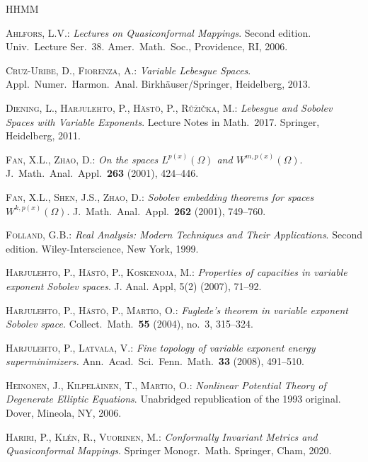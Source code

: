 \documentclass[12pt]{amsart}
\numberwithin{equation}{section}
\theoremstyle{plain}
\theoremstyle{definition}
\begin{document}
\begin{thebibliography}{HHMM}

{\small \textsc{Ahlfors, L.V.:}
\textit{Lectures on Quasiconformal Mappings}.
Second edition.
Univ.\ Lecture Ser.\ 38.
Amer.\ Math.\ Soc., Providence, RI, 2006.}


{\small \textsc{Cruz-Uribe, D., Fiorenza, A.:}
\textit{Variable Lebesgue Spaces}.
Appl.\ Numer.\ Harmon.\ Anal.
Birkh\"auser/Springer, Heidelberg, 2013.}

{\small \textsc{Diening, L., Harjulehto, P., H\"ast\"o, P.,
R\r{u}\v{z}i\v{c}ka, M.:}
\textit{Lebesgue and Sobolev Spaces with Variable Exponents}.
Lecture Notes in Math.\ 2017.
Springer, Heidelberg, 2011.}


{\small \textsc{Fan, X.L., Zhao, D.:}
\textit{On the spaces $L^{p(x)}(\Omega)$ and $W^{m,p(x)}(\Omega)$}.
J.\ Math.\ Anal.\ Appl.\ \textbf{263} (2001), 424--446.}

{\small \textsc{Fan, X.L., Shen, J.S., Zhao, D.:}
\textit{Sobolev embedding theorems for spaces $W^{k,p(x)}(\Omega)$}.
J.\ Math.\ Anal.\ Appl.\ \textbf{262} (2001), 749--760.}

{\small \textsc{Folland, G.B.:}
\textit{Real Analysis: Modern Techniques and Their Applications}.
Second edition.
Wiley-Interscience, New York, 1999.}


{\small \textsc{Harjulehto, P., H\"ast\"o, P., Koskenoja, M.:}
\textit{Properties of capacities in variable exponent Sobolev spaces}. J. Anal. Appl, 5(2) (2007), 71--92.}

{\small \textsc{Harjulehto, P., H\"ast\"o, P., Martio, O.:}
\textit{Fuglede's theorem in variable exponent Sobolev space.}
Collect.\ Math.\ \textbf{55} (2004), no.~3, 315--324.}

{\small \textsc{Harjulehto, P., Latvala, V.:}
\textit{Fine topology of variable exponent energy superminimizers.}
Ann.\ Acad.\ Sci.\ Fenn.\ Math.\ \textbf{33} (2008), 491--510.}

{\small \textsc{Heinonen, J., Kilpel\"ainen, T., Martio, O.:}
\textit{Nonlinear Potential Theory of Degenerate Elliptic Equations}.
Unabridged republication of the 1993 original.
Dover, Mineola, NY, 2006.}

{\small \textsc{Hariri, P., Kl\'en, R., Vuorinen, M.:}
\textit{Conformally Invariant Metrics and Quasiconformal Mappings}.
Springer Monogr.\ Math.
Springer, Cham, 2020.}


\end{thebibliography}
\end{document}
